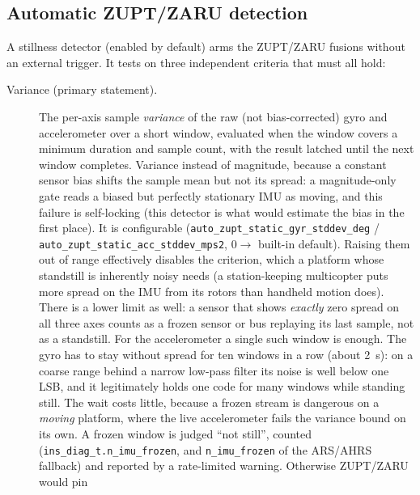 \documentclass[11pt,a4paper]{article}
\newcommand{\code}[1]{\texttt{#1}}
\begin{document}
\subsection{Automatic ZUPT/ZARU detection}
\label{sec:autozupt}

A stillness detector (enabled by default) arms the ZUPT/ZARU fusions
without an external trigger. It tests on three independent criteria that
must all hold:

\begin{description}
  \item[Variance (primary statement).] The per-axis sample
    \emph{variance} of the raw (not bias-corrected) gyro and
    accelerometer over a short window, evaluated when the
    window covers a minimum duration and sample count, with the
    result latched until the next window completes. Variance instead of
    magnitude, because a constant sensor bias shifts the sample
    mean but not its spread: a magnitude-only gate reads a biased but
    perfectly stationary IMU as moving, and this failure is
    self-locking (this detector is what would estimate the bias in
    the first place). It is configurable
    (\code{auto\_\allowbreak{}zupt\_\allowbreak{}static\_\allowbreak{}gyr\_\allowbreak{}stddev\_\allowbreak{}deg} /
    \code{auto\_\allowbreak{}zupt\_\allowbreak{}static\_\allowbreak{}acc\_\allowbreak{}stddev\_\allowbreak{}mps2}, $0 \to$ built-in
    default). Raising them out of range effectively disables the
    criterion, which a platform whose standstill is inherently noisy
    needs (a station-keeping multicopter puts more spread on the IMU
    from its rotors than handheld motion does).
    There is a lower limit as well: a sensor that shows \emph{exactly}
    zero spread on all three axes counts as a frozen sensor or bus
    replaying its last sample, not as a standstill. For the
    accelerometer a single such window is enough. The gyro has to stay
    without spread for ten windows in a row (about \SI{2}{\second}):
    on a coarse range behind a narrow low-pass filter its noise is well
    below one LSB, and it legitimately holds one code for many windows
    while standing still. The wait costs little, because a frozen stream
    is dangerous on a \emph{moving} platform, where the live
    accelerometer fails the variance bound on its own. A frozen window
    is judged ``not still'', counted
    (\code{ins\_\allowbreak{}diag\_\allowbreak{}t.n\_\allowbreak{}imu\_\allowbreak{}frozen}, and
    \code{n\_\allowbreak{}imu\_\allowbreak{}frozen} of the ARS/AHRS fallback) and
    reported by a rate-limited warning. Otherwise ZUPT/ZARU would pin

\end{description}
\end{document}
